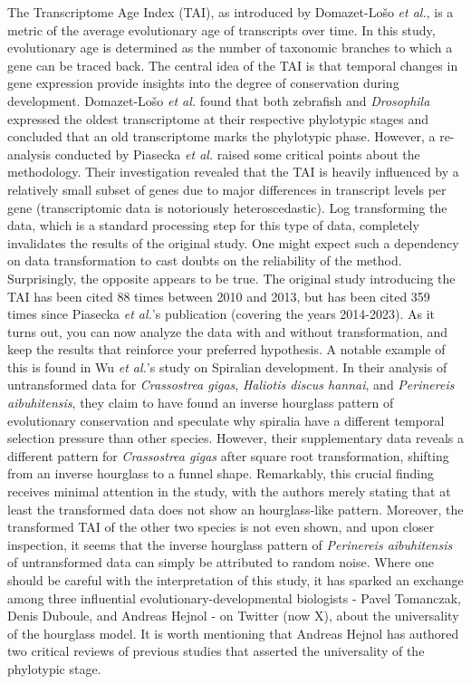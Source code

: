 The Transcriptome Age Index (TAI), as introduced by Domazet-Lošo \textit{et al.}, is a metric of the average evolutionary age of transcripts over time\cite{DomazetLoso2010}. In this study, evolutionary age is determined as the number of taxonomic branches to which a gene can be traced back. The central idea of the TAI is that temporal changes in gene expression provide insights into the degree of conservation during development. Domazet-Lošo \textit{et al.} found that both zebrafish and \textit{Drosophila} expressed the oldest transcriptome at their respective phylotypic stages and concluded that an old transcriptome marks the phylotypic phase. However, a re-analysis conducted by Piasecka \textit{et al.} raised some critical points about the methodology\cite{Piasecka2013}. Their investigation revealed that the TAI is heavily influenced by a relatively small subset of genes due to major differences in transcript levels per gene (transcriptomic data is notoriously heteroscedastic). Log transforming the data, which is a standard processing step for this type of data, completely invalidates the results of the original study. One might expect such a dependency on data transformation to cast doubts on the reliability of the method. Surprisingly, the opposite appears to be true. The original study introducing the TAI has been cited 88 times between 2010 and 2013, but has been cited 359 times since Piasecka \textit{et al.}'s publication (covering the years 2014-2023). As it turns out, you can now analyze the data with and without transformation, and keep the results that reinforce your preferred hypothesis. A notable example of this is found in Wu \textit{et al.}'s study on Spiralian development\cite{Wu2019}. In their analysis of untransformed data for \textit{Crassostrea gigas}, \textit{Haliotis discus hannai}, and \textit{Perinereis aibuhitensis}, they claim to have found an inverse hourglass pattern of evolutionary conservation and speculate why spiralia have a different temporal selection pressure than other species. However, their supplementary data reveals a different pattern for \textit{Crassostrea gigas} after square root transformation, shifting from an inverse hourglass to a funnel shape. Remarkably, this crucial finding receives minimal attention in the study, with the authors merely stating that at least the transformed data does not show an hourglass-like pattern. Moreover, the transformed TAI of the other two species is not even shown, and upon closer inspection, it seems that the inverse hourglass pattern of \textit{Perinereis aibuhitensis} of untransformed data can simply be attributed to random noise. Where one should be careful with the interpretation of this study, it has sparked an exchange among three influential evolutionary-developmental biologists - Pavel Tomanczak, Denis Duboule, and Andreas Hejnol - on Twitter (now X), about the universality of the hourglass model\cite{hejnoltwitter}. It is worth mentioning that Andreas Hejnol has authored two critical reviews of previous studies that asserted the universality of the phylotypic stage\cite{Dunn2018,hejnol2016}.

